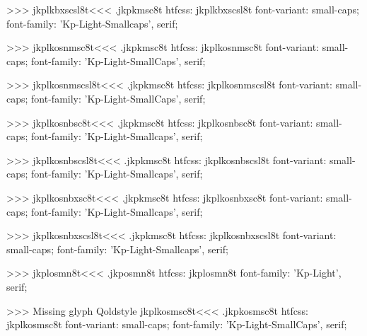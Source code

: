 >>>
\<jkplkbxscsl8t\><<<
.jkpkmsc8t
htfcss:  jkplkbxscsl8t  font-variant: small-caps; font-family: 'Kp-Light-Smallcaps', serif;

>>>
\<jkplkosnmsc8t\><<<
.jkpkmsc8t
htfcss:  jkplkosnmsc8t  font-variant: small-caps; font-family: 'Kp-Light-SmallCaps', serif;

>>>
\<jkplkosnmscsl8t\><<<
.jkpkmsc8t
htfcss:  jkplkosnmscsl8t  font-variant: small-caps; font-family: 'Kp-Light-SmallCaps', serif;

>>>
\<jkplkosnbsc8t\><<<
.jkpkmsc8t
htfcss:  jkplkosnbsc8t  font-variant: small-caps; font-family: 'Kp-Light-Smallcaps', serif;

>>>
\<jkplkosnbscsl8t\><<<
.jkpkmsc8t
htfcss:  jkplkosnbscsl8t  font-variant: small-caps; font-family: 'Kp-Light-Smallcaps', serif;

>>>
\<jkplkosnbxsc8t\><<<
.jkpkmsc8t
htfcss:  jkplkosnbxsc8t  font-variant: small-caps; font-family: 'Kp-Light-Smallcaps', serif;

>>>
\<jkplkosnbxscsl8t\><<<
.jkpkmsc8t
htfcss:  jkplkosnbxscsl8t  font-variant: small-caps; font-family: 'Kp-Light-Smallcaps', serif;

>>>
\<jkplosmn8t\><<<
.jkposmn8t
htfcss:  jkplosmn8t  font-family: 'Kp-Light', serif;

>>>
Missing glyph	Qoldstyle
\<jkplkosmsc8t\><<<
.jkpkosmsc8t
htfcss:  jkplkosmsc8t  font-variant: small-caps; font-family: 'Kp-Light-SmallCaps', serif;

